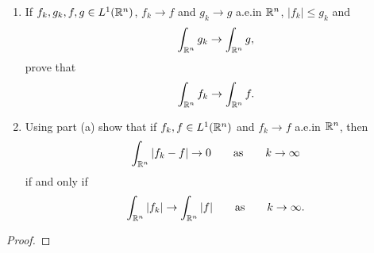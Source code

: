 \begin{problem}
\begin{enumerate}[label=(\alph*)]
\item If $f_k,g_k,f,g\in L^1(\mathbb{R}^n)$, $f_k\to f$ and $g_k\to g$ a.e.\@ in
  $\mathbb{R}^n$, $|f_k|\leq g_k$ and
\[
\int_{\mathbb{R}^n}g_k\to\int_{\mathbb{R}^n}g,
\]
prove that
\[
\int_{\mathbb{R}^n} f_k\to\int_{\mathbb{R}^n}f.
\]
\item Using part (a) show that if $f_k,f\in L^1(\mathbb{R}^n)$ and $f_k\to f$
  a.e.\@ in $\mathbb{R}^n$, then
\[
\int_{\mathbb{R}^n}|f_k-f|\to 0\qquad\text{as}\qquad k\to\infty
\]
if and only if
\[
\int_{\mathbb{R}^n}|f_k|\to\int_{\mathbb{R}^n}|f|\qquad\text{as}\qquad k\to\infty.
\]
\end{enumerate}
\end{problem}
\begin{proof}
\end{proof}

